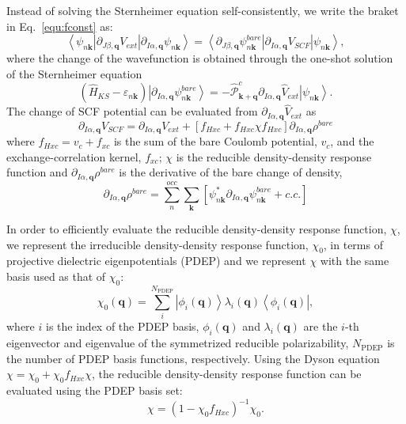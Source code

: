 \documentclass[journal=jctcce,manuscript=article]{achemso}
\newcommand{\Iaq}{{I\alpha,\mathbf{q}}}
\newcommand{\Jbq}{{J\beta,\mathbf{q}}}
\newcommand{\bfk}{{\mathbf{k}}}
\newcommand{\bfq}{{\mathbf{q}}}
\begin{document}
Instead of solving the Sternheimer equation self-consistently, we write the braket in Eq.~\ref{equ:fconst} as:\cite{mcavoy2018coupling}
\begin{equation}
    \left\langle \psi_{n\mathbf{k}}
    \left|
    \partial_\Jbq V_{ext}
    \right|
    \partial_{I\alpha,\mathbf{q}}\psi_{n\mathbf{k}}
    \right\rangle
    = 
    \left\langle
    \partial_\Jbq \psi_{n\mathbf{k}}^{bare}
    \left|
    \partial_\Iaq V_{SCF}
    \right|
    \psi_{n\mathbf{k}}
    \right\rangle,
\end{equation}
where the change of the wavefunction is obtained through the one-shot solution of the Sternheimer equation
\begin{equation}
    (\hat{H}_{KS}-\varepsilon_{n\mathbf{k}})\left|\partial_\Iaq \psi_{n\mathbf{k}}^{bare}\right\rangle = -\hat{\mathcal{P}}^c_{\mathbf{k}+\mathbf{q}}\partial_\Iaq \hat{V}_{ext}\left|\psi_{n\mathbf{k}}\right\rangle.
\end{equation}
The change of SCF potential can be evaluated from $\partial_\Iaq \hat{V}_{ext}$ as
\begin{equation}
    \partial_\Iaq V_{SCF} = \partial_\Iaq V_{ext} + [f_{Hxc}+f_{Hxc}\chi f_{Hxc}]\partial_\Iaq \rho^{bare} \label{equ:dVscf}
\end{equation}
where $f_{Hxc} = v_c +f_{xc}$ is the sum of the bare Coulomb potential, $v_c$, and the exchange-correlation kernel, $f_{xc}$; $\chi$ is the reducible density-density response function and $\partial_\Iaq\rho^{bare}$ is the derivative of the bare change of density,
\begin{equation}
    \partial_\Iaq \rho^{bare} = \sum_{n}^{occ}\sum_\mathbf{k} \left[\psi_{n\bfk}^*\partial_\Iaq\psi_{n\bfk}^{bare} + c.c. \right]
\end{equation}

In order to efficiently evaluate the reducible density-density response function, $\chi$, we represent the irreducible density-density response function, $\chi_0$, in terms of projective dielectric eigenpotentials (PDEP)\cite{wilson2009iterative,pham2013g,govoni2015large,yang2019improving} and we represent $\chi$ with the same basis used as that of $\chi_0$:
\begin{equation}
    \chi_0(\bfq) = \sum_i^{N_\mathrm{PDEP}} \left|\phi_{i}(\bfq)\right\rangle\lambda_i(\bfq)\left\langle\phi_i(\bfq)\right|,
\end{equation}
where $i$ is the index of the PDEP basis, $\phi_i(\bfq)$ and $\lambda_i(\bfq)$ are the $i$-th eigenvector and eigenvalue of the symmetrized reducible polarizability, $N_\mathrm{PDEP}$ is the number of PDEP basis functions, respectively. Using the Dyson equation $\chi = \chi_0 +\chi_0 f_{Hxc} \chi$, the reducible density-density response function can be evaluated using the PDEP basis set:
\begin{equation}
    \chi = (1-\chi_0 f_{Hxc})^{-1}\chi_0.
\end{equation}
\end{document}
